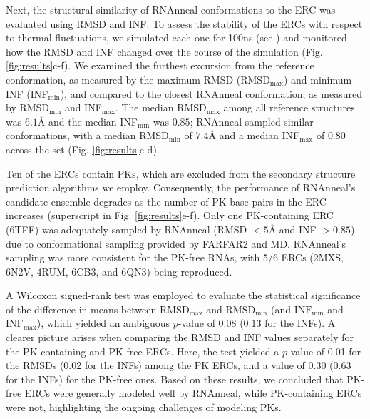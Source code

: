 \documentclass[%
aip,
 amsmath,amssymb,
reprint,%
twocolumn,
]{revtex4-1}
\begin{document}
{Next, the structural similarity of RNAnneal conformations to the ERC was evaluated using RMSD and INF. To assess the stability of the ERCs with respect to thermal fluctuations, we simulated each one for 100ns (see ) and monitored how the RMSD and INF changed over the course of the simulation (Fig. \ref{fig:results}c-f). We examined the furthest excursion from the reference conformation, as measured by the maximum RMSD (RMSD$_{\mathrm{max}}$) and minimum INF (INF$_{\mathrm{min}}$), and compared to the closest RNAnneal conformation, as measured by RMSD$_{\mathrm{min}}$ and INF$_{\mathrm{max}}$. The median RMSD$_{\mathrm{max}}$ among all reference structures was $6.1${\AA} and the median INF$_{\mathrm{min}}$ was $0.85$; RNAnneal sampled similar conformations, with a median RMSD$_{\mathrm{min}}$ of $7.4${\AA} and a median INF$_{\mathrm{max}}$ of $0.80$ across the set (Fig. \ref{fig:results}c-d).

Ten of the ERCs contain PKs, which are excluded from the secondary structure prediction algorithms we employ. Consequently, the performance of RNAnneal's candidate ensemble degrades as the number of PK base pairs in the ERC increases (superscript in Fig. \ref{fig:results}e-f). Only one PK-containing ERC (6TFF\cite{Huang2020}) was adequately sampled by RNAnneal (RMSD $<5${\AA} and INF $>0.85$) due to conformational sampling provided by FARFAR2 and MD. RNAnneal's sampling was more consistent for the PK-free RNAs, with 5/6 ERCs (2MXS\cite{Schmidtke2015}, 6N2V\cite{Price2018}, 4RUM\cite{Ramesh2014}, 6CB3\cite{Bachas2018}, and 6QN3\cite{Huang2019}) being reproduced. 

A Wilcoxon signed-rank test was employed to evaluate the statistical significance of the difference in means between $\mathrm{RMSD}_\mathrm{max}$ and $\mathrm{RMSD}_\mathrm{min}$ (and $\mathrm{INF}_\mathrm{min}$ and $\mathrm{INF}_\mathrm{max}$), which yielded an ambiguous $p$-value of 0.08 (0.13 for the INFs). A clearer picture arises when comparing the RMSD and INF values separately for the PK-containing and PK-free ERCs. Here, the test yielded a $p$-value of 0.01 for the RMSDs (0.02 for the INFs) among the PK ERCs, and a value of 0.30 (0.63 for the INFs) for the PK-free ones. Based on these results, we concluded that PK-free ERCs were generally modeled well by RNAnneal, while PK-containing ERCs were not, highlighting the ongoing challenges of modeling PKs.

}
\end{document}
